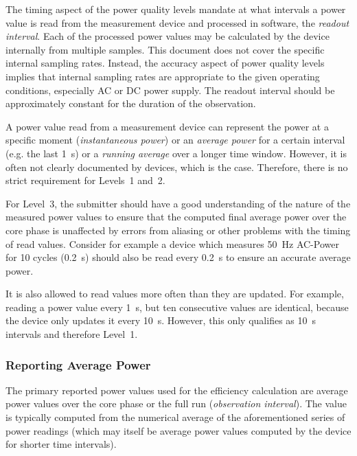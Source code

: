 The timing aspect of the power quality levels mandate at what intervals a power value is read from the measurement device and processed in software, the \emph{readout interval}.
Each of the processed power values may be calculated by the device internally from multiple samples.
This document does not cover the specific internal sampling rates.
Instead, the accuracy aspect of power quality levels implies that internal sampling rates are appropriate to the given operating conditions, especially AC or DC power supply.
The readout interval should be approximately constant for the duration of the observation.

A power value read from a measurement device can represent the power at a specific moment (\emph{instantaneous power}) or an \emph{average power} for a certain interval (e.g. the last \SI{1}{\second}) or a \emph{running average} over a longer time window.
However, it is often not clearly documented by devices, which is the case.
Therefore, there is no strict requirement for Levels~1 and~2.

For Level~3, the submitter should have a good understanding of the nature of the measured power values to ensure that the computed final average power over the core phase is unaffected by errors from aliasing or other problems with the timing of read values.
Consider for example a device which measures \SI{50}{\hertz} AC-Power for 10 cycles (\SI{0.2}{\second}) should also be read every \SI{0.2}{\second} to ensure an accurate average power.

It is also allowed to read values more often than they are updated.
For example, reading a power value every \SI{1}{\second}, but ten consecutive values are identical, because the device only updates it every \SI{10}{\second}.
However, this only qualifies as \SI{10}{\second} intervals and therefore Level~1.

\subsubsection{Reporting Average Power}

The primary reported power values used for the efficiency calculation are average power values over the core phase or the full run (\emph{observation interval}).
The value is typically computed from the numerical average of the aforementioned series of power readings (which may itself be average power values computed by the device for shorter time intervals).

